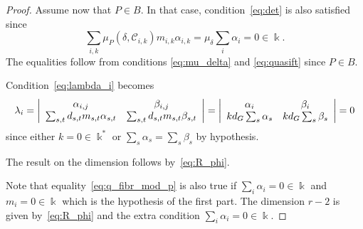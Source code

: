\documentclass[10pt,a4paper]{amsart}
\def\cC{\mathcal{C}}
\def\kk{\Bbbk}
\begin{document}
\begin{proof}
Assume now that $P\in B$. In that case, condition~\eqref{eq:det} is also satisfied 
since 
\begin{equation} \label{eq:q_fibr_mod_p}
    \sum_{i,k} \mu_P(\delta,\cC_{i,k})m_{i,k}\alpha_{i,k}=
\mu_\delta \sum_i \alpha_i = 0\in\kk.
\end{equation}
The equalities follow from conditions \eqref{eq:mu_delta} and \eqref{eq:quasift} since $P\in B$. 

Condition~\eqref{eq:lambda_i} becomes
\begin{equation} \label{eq:non_base_P_lambda}
\lambda_i=
\left|
\array{cc}
\alpha_{i,j} & \beta_{i,j}\\
\sum_{s,t} d_{s,t}m_{s,t}\alpha_{s,t} & \sum_{s,t} d_{s,t}m_{s,t}\beta_{s,t}\\
\endarray
\right|=
    \left|
\array{cc}
\alpha_{i} & \beta_{i}\\
kd_G\sum_{s} \alpha_{s} & kd_G\sum_{s} \beta_{s}\\
\endarray
\right|=
0
\end{equation}
since either $k=0\in\kk^*$ or $\sum_{s} \alpha_{s}=\sum_{s} \beta_{s}$ by hypothesis.

The result on the dimension follows by~\eqref{eq:R_phi}.

Note that equality~\eqref{eq:q_fibr_mod_p} is also true if $\sum_i\alpha_i=0\in\kk$ and $m_i=0\in\kk$ which is the hypothesis of the first part. The dimension $r-2$ is given by~\eqref{eq:R_phi} and the extra condition $\sum_i\alpha_i=0\in\kk$.
\end{proof}
\end{document}
